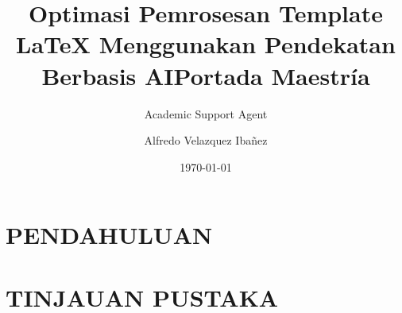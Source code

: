 \documentclass{book}
\title{Optimasi Pemrosesan Template LaTeX Menggunakan Pendekatan Berbasis AI}
\author{Academic Support Agent}
\date{\today}
\begin{document}
\maketitle

\begin{abstract}

\end{abstract}

\chapter{PENDAHULUAN}


\chapter{TINJAUAN PUSTAKA}


\usepackage{lmodern} %
\usepackage[T1]{fontenc} %
\usepackage[spanish]{babel} %
\usepackage{caption, subcaption} %
\usepackage{graphicx}
\usepackage{array}
\usepackage[width=155mm,top=25mm,bottom=25mm, headheight=15pt,]{geometry} %

\title{Portada Maestría}
\author{Alfredo Velazquez Ibañez}
\end{document}
